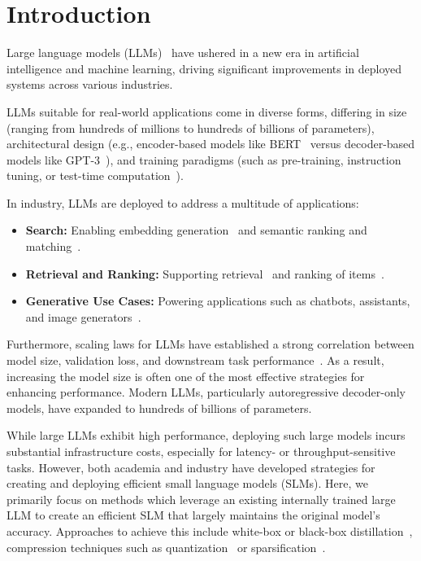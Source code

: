 \section{Introduction}

Large language models (LLMs)~\cite{dubey2024llama, jiang2023mistral, team2023gemini, liu2024deepseek} have ushered in a new era in artificial intelligence and machine learning, driving significant improvements in deployed systems across various industries.

LLMs suitable for real-world applications come in diverse forms, differing in size (ranging from hundreds of millions to hundreds of billions of parameters), architectural design (e.g., encoder-based models like BERT~\cite{devlin2018bert} versus decoder-based models like GPT-3~\cite{brown2020language}), and training paradigms (such as pre-training, instruction tuning, or test-time computation~\cite{dubey2024llama,team2023gemini,jiang2023mistral,mueller2023meta,liu2024deepseek,guo2025deepseek}).

In industry, LLMs are deployed to address a multitude of applications:
\begin{itemize}
    \item \textbf{Search:} Enabling embedding generation~\cite{wang2022text, wang2023improving} and semantic ranking and matching~\cite{qin2023large}.
    \item \textbf{Retrieval and Ranking:} Supporting retrieval~\cite{zhao2024dense} and ranking of items~\cite{li2023agent4ranking,firooz2025360brew,li2023text}.
    \item \textbf{Generative Use Cases:} Powering applications such as chatbots, assistants, and image generators~\cite{achiam2023gpt, dam2024complete, ramesh2022hierarchical}.
\end{itemize}

Furthermore, scaling laws for LLMs have established a strong correlation between model size, validation loss, and downstream task performance~\cite{kaplan2020scaling, hoffmann2022training, raffel2020exploring, wei2022chain}. As a result, increasing the model size is often one of the most effective strategies for enhancing performance. Modern LLMs, particularly autoregressive decoder-only models, have expanded to hundreds of billions of parameters.

While large LLMs exhibit high performance, deploying such large models incurs substantial infrastructure costs, especially for latency- or throughput-sensitive tasks. However, both academia and industry have developed strategies for creating and deploying efficient small language models (SLMs). Here, we primarily focus on methods which leverage an existing internally trained large LLM to create an efficient SLM that largely maintains the original model's accuracy. Approaches to achieve this include white-box or black-box distillation~\cite{hinton2015distilling, gu2024minillm, jin2021modality, agarwal2024policy, tunstall2023zephyr}, compression techniques such as quantization~\cite{frantar2022gptq, behdin2023quantease} or sparsification~\cite{frantar2023sparsegpt, meng2024osscar, sun2023simple, meng2024alps}.


